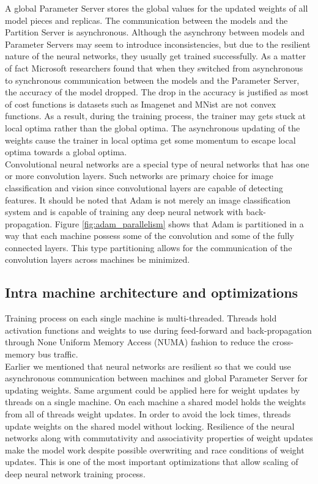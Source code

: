 \documentclass[runningheads,a4paper]{llncs}
\begin{document}
A global Parameter Server stores the global values for the updated weights of all model pieces and replicas. The communication between the models and the Partition Server is asynchronous. Although the asynchrony between models and Parameter Servers may seem to introduce inconsistencies, but due to the resilient nature of the neural networks, they usually get trained successfully. As a matter of fact Microsoft researchers found that when they switched from asynchronous to synchronous communication between the models and the Parameter Server, the accuracy of the model dropped. The drop in the accuracy is justified as most of cost functions is datasets such as Imagenet and MNist are not convex functions. As a result, during the training process, the trainer may gets stuck at local optima rather than the global optima. The asynchronous updating of the weights cause the trainer in local optima get some momentum to escape local optima towards a global optima.\\

Convolutional neural networks are a special type of neural networks that has one or more convolution layers. Such networks are primary choice for image classification and vision since convolutional layers are capable of detecting features. It should be noted that Adam is not merely an image classification system and is capable of training any deep neural network with back-propagation. Figure \ref{fig:adam_parallelism} shows that Adam is partitioned in a way that each machine possess some of the convolution and some of the fully connected layers. This type partitioning allows for the communication of the convolution layers across machines be minimized.\\

\subsection{Intra machine architecture and optimizations}

Training process on each single machine is multi-threaded. Threads hold activation functions and weights to use during feed-forward and back-propagation through None Uniform Memory Access (NUMA) fashion to reduce the cross-memory bus traffic.\\

Earlier we mentioned that neural networks are resilient so that we could use asynchronous communication between machines and global Parameter Server for updating weights. Same argument could be applied here for weight updates by threads on a single machine. On each machine a shared model holds the weights from all of threads weight updates. In order to avoid the lock times, threads update weights on the shared model without locking. Resilience of the neural networks along with commutativity and associativity properties of weight updates make the model work despite possible overwriting and race conditions of weight updates. This is one of the most important optimizations that allow scaling of deep neural network training process.
\end{document}
